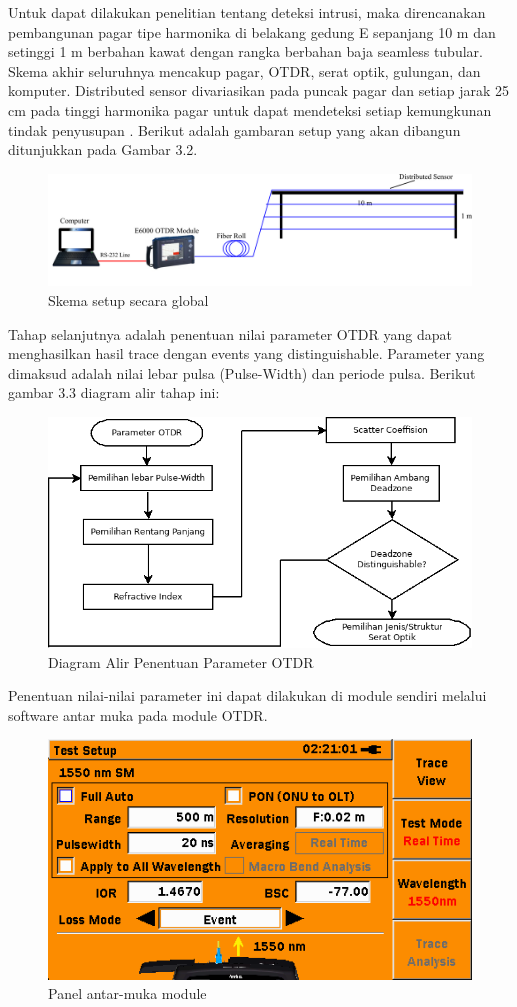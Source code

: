 \documentclass[12pt]{article}
\begin{document}
	Untuk dapat dilakukan penelitian tentang deteksi intrusi, maka direncanakan pembangunan pagar tipe harmonika di belakang gedung E sepanjang 10 m dan setinggi 1 m berbahan kawat dengan rangka berbahan baja seamless tubular.
	Skema akhir seluruhnya mencakup pagar, OTDR, serat optik, gulungan, dan komputer.
	Distributed sensor divariasikan pada puncak pagar dan setiap jarak 25 cm pada tinggi harmonika pagar untuk dapat mendeteksi setiap kemungkunan tindak penyusupan \cite{Huang2017}.
	Berikut adalah gambaran setup yang akan dibangun ditunjukkan pada Gambar 3.2.
	
	\begin{figure}[h!]
		\centering
		\captionsetup{justification=centering}
		\includegraphics[width=0.5\linewidth]{images/Bab_3/Bab_3_2}
		\caption[Skema Setup]{\small{Skema setup secara global}}
	\end{figure}

	Tahap selanjutnya adalah penentuan nilai parameter OTDR yang dapat menghasilkan hasil trace dengan events yang distinguishable. Parameter yang dimaksud adalah nilai lebar pulsa (Pulse-Width) dan periode pulsa.
	Berikut gambar 3.3 diagram alir tahap ini:
	
	\begin{figure}[h!]
		\centering
		\captionsetup{justification=centering}
		\includegraphics[width=0.5\linewidth]{images/Bab_3/Bab_3_3}
		\caption[Parameter OTDR ]{\small{Diagram Alir Penentuan Parameter OTDR }}
	\end{figure}

	Penentuan nilai-nilai parameter ini dapat dilakukan di module sendiri melalui software antar muka pada module OTDR.
	
	\begin{figure}[h!]
		\centering
		\captionsetup{justification=centering}
		\includegraphics[width=0.5\linewidth]{images/Bab_3/Bab_3_4}
		\caption[panel antar-muka module]{\small{Panel antar-muka module }}
	\end{figure}
\end{document}
